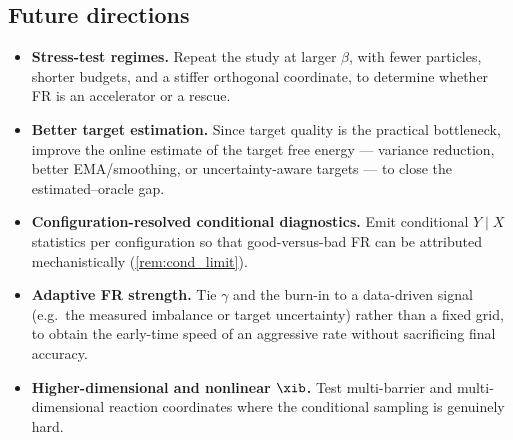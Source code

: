 \subsection{Future directions}
\begin{itemize}
  \item \textbf{Stress-test regimes.} Repeat the study at larger $\beta$, with
        fewer particles, shorter budgets, and a stiffer orthogonal coordinate,
        to determine whether FR is an accelerator or a rescue.
  \item \textbf{Better target estimation.} Since target quality is the practical
        bottleneck, improve the online estimate of the target free energy ---
        variance reduction, better EMA/smoothing, or uncertainty-aware targets
        --- to close the estimated--oracle gap.
  \item \textbf{Configuration-resolved conditional diagnostics.} Emit
        conditional $Y\mid X$ statistics per configuration so that good-versus-bad
        FR can be attributed mechanistically (\cref{rem:cond_limit}).
  \item \textbf{Adaptive FR strength.} Tie $\gamma$ and the burn-in to a
        data-driven signal (e.g.\ the measured imbalance or target uncertainty)
        rather than a fixed grid, to obtain the early-time speed of an aggressive
        rate without sacrificing final accuracy.
  \item \textbf{Higher-dimensional and nonlinear $\xib$.} Test multi-barrier and
        multi-dimensional reaction coordinates where the conditional sampling is
        genuinely hard.
\end{itemize}
